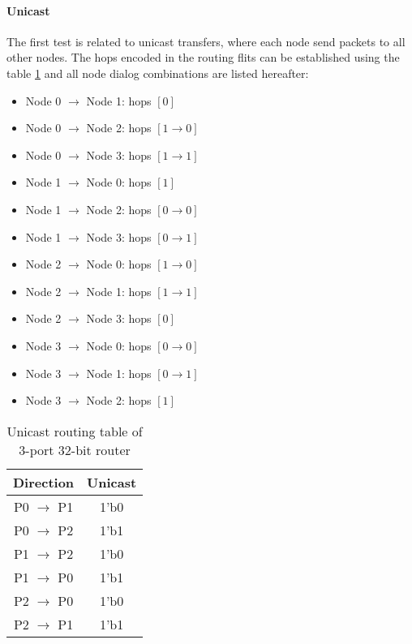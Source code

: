 \paragraph{Unicast}

The first test is related to unicast transfers, where each node send packets to all other nodes. The hops encoded in the
routing flits can be established using the table \ref{unicast_routing_table_3port_32bit_router} and all node dialog
combinations are listed hereafter:

\begin{itemize}
\item Node 0 $\rightarrow$ Node 1: hops $[0]$
\item Node 0 $\rightarrow$ Node 2: hops $[1 \rightarrow 0]$
\item Node 0 $\rightarrow$ Node 3: hops $[1 \rightarrow 1]$
\end{itemize}
\begin{itemize}
\item Node 1 $\rightarrow$ Node 0: hops $[1]$
\item Node 1 $\rightarrow$ Node 2: hops $[0 \rightarrow 0]$
\item Node 1 $\rightarrow$ Node 3: hops $[0 \rightarrow 1]$
\end{itemize}
\begin{itemize}
\item Node 2 $\rightarrow$ Node 0: hops $[1 \rightarrow 0]$
\item Node 2 $\rightarrow$ Node 1: hops $[1 \rightarrow 1]$
\item Node 2 $\rightarrow$ Node 3: hops $[0]$
\end{itemize}
\begin{itemize}
\item Node 3 $\rightarrow$ Node 0: hops $[0 \rightarrow 0]$
\item Node 3 $\rightarrow$ Node 1: hops $[0 \rightarrow 1]$
\item Node 3 $\rightarrow$ Node 2: hops $[1]$
\end{itemize}

\begin{table}[h]
  \centering
  \begin{tabular}{c | c }
    \toprule
    \hline
    \textbf{Direction} & \textbf{Unicast} \\
    \hline\hline
    P0 $\rightarrow$ P1 & 1'b0 \\
    \hline
    P0 $\rightarrow$ P2 & 1'b1 \\
    \hline
    P1 $\rightarrow$ P2 & 1'b0 \\
    \hline
    P1 $\rightarrow$ P0 & 1'b1 \\
    \hline
    P2 $\rightarrow$ P0 & 1'b0 \\
    \hline
    P2 $\rightarrow$ P1 & 1'b1 \\
    \hline
    \bottomrule
  \end{tabular}
  \caption{Unicast routing table of 3-port 32-bit router}
  \label{unicast_routing_table_3port_32bit_router}
\end{table}

